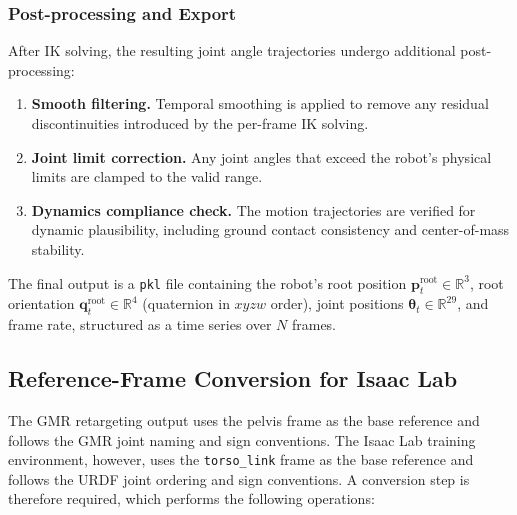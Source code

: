 \subsubsection{Post-processing and Export}

After IK solving, the resulting joint angle trajectories undergo additional post-processing:
\begin{enumerate}
    \item \textbf{Smooth filtering.} Temporal smoothing is applied to remove any residual discontinuities introduced by the per-frame IK solving.
    \item \textbf{Joint limit correction.} Any joint angles that exceed the robot's physical limits are clamped to the valid range.
    \item \textbf{Dynamics compliance check.} The motion trajectories are verified for dynamic plausibility, including ground contact consistency and center-of-mass stability.
\end{enumerate}

The final output is a \texttt{pkl} file containing the robot's root position $\mathbf{p}_t^{\text{root}} \in \mathbb{R}^3$, root orientation $\mathbf{q}_t^{\text{root}} \in \mathbb{R}^4$ (quaternion in $xyzw$ order), joint positions $\boldsymbol{\theta}_t \in \mathbb{R}^{29}$, and frame rate, structured as a time series over $N$ frames.

\subsection{Reference-Frame Conversion for Isaac Lab}
\label{sec:frame_conversion}

The GMR retargeting output uses the pelvis frame as the base reference and follows the GMR joint naming and sign conventions. The Isaac Lab training environment, however, uses the \texttt{torso\_link} frame as the base reference and follows the URDF joint ordering and sign conventions. A conversion step is therefore required, which performs the following operations:

